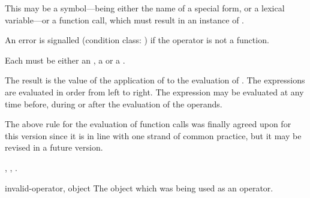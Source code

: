 \begin{optDefinition}
%
\Syntax
{}%
%
\begin{arguments}
    \item[\scref{operator}] This may be a symbol---being either the name of a
    special form, or a lexical variable---or a function call, which must result
    in an instance of .

    An error is signalled (condition class: 
    ) if the operator is not a function.

    \item[\scseqref{operand}] Each  must be either an
    , a  or a
    .
\end{arguments}
%
\result%
The result is the value of the application of  to the
evaluation of .
%
\remarks%
The  expressions are evaluated in order from left to
right.  The  expression may be evaluated at any time
before, during or after the evaluation of the operands.
%
\begin{note}
    The above rule for the evaluation of function calls was finally agreed upon
    for this version since it is in line with one strand of common practice, but
    it may be revised in a future version.
\end{note}
%
\seealso%
, , .

%
\begin{initoptions}
    \item[invalid-operator, object] The object which was being used as an
    operator.


\end{initoptions}
\end{optDefinition}
